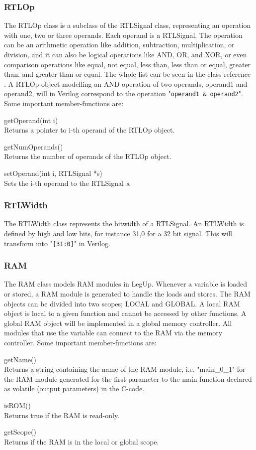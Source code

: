 \subsubsection{RTLOp}
The RTLOp class is a subclass of the RTLSignal class, representing an operation with one, two or three operands. Each operand is a RTLSignal. The operation can be an arithmetic operation like addition, subtraction, multiplication, or division, and it can also be logical operations like AND, OR, and XOR, or even comparison operations like equal, not equal, less than, less than or equal, greater than, and greater than or equal. The whole list can be seen in the class reference \cite{rtlopclassref}. A RTLOp object modelling an AND operation of two operands, operand1 and operand2, will in Verilog correspond to the operation "\verb!operand1 & operand2!". Some important member-functions are:
\begin{compactdesc}
    \item[getOperand(int i)] \hfill \\
    Returns a pointer to i-th operand of the RTLOp object.
    \item[getNumOperands()] \hfill \\
    Returns the number of operands of the RTLOp object.
    \item[setOperand(int i, RTLSignal *s)] \hfill \\
    Sets the i-th operand to the RTLSignal \textit{s}.
\end{compactdesc}
\subsubsection{RTLWidth}
The RTLWidth class represents the bitwidth of a RTLSignal. An RTLWidth is defined by high and low bits, for instance 31,0 for a 32 bit signal. This will transform into "\verb![31:0]!" in Verilog.
\subsubsection{RAM}
The RAM class models RAM modules in LegUp. Whenever a variable is loaded or stored, a RAM module is generated to handle the loads and stores. The RAM objects can be divided into two scopes; LOCAL and GLOBAL. A local RAM object is local to a given function and cannot be accessed by other functions. A global RAM object will be implemented in a global memory controller. All modules that use the variable can connect to the RAM via the memory controller. Some important member-functions are:
\begin{compactdesc}
    \item[getName()] \hfill \\
    Returns a string containing the name of the RAM module, i.e. "main\_0\_1" for the RAM module generated for the first parameter to the main function declared as volatile (output parameters) in the C-code.
    \item[isROM()] \hfill \\
    Returns true if the RAM is read-only.
    \item[getScope()] \hfill \\
    Returns if the RAM is in the local or global scope.
\end{compactdesc}


